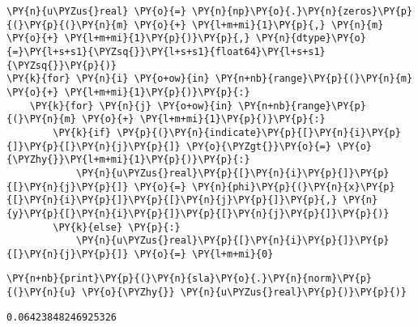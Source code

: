     \begin{tcolorbox}[breakable, size=fbox, boxrule=1pt, pad at break*=1mm,colback=cellbackground, colframe=cellborder]
\begin{Verbatim}[commandchars=\\\{\}]
\PY{n}{u\PYZus{}real} \PY{o}{=} \PY{n}{np}\PY{o}{.}\PY{n}{zeros}\PY{p}{(}\PY{p}{(}\PY{n}{m} \PY{o}{+} \PY{l+m+mi}{1}\PY{p}{,} \PY{n}{m} \PY{o}{+} \PY{l+m+mi}{1}\PY{p}{)}\PY{p}{,} \PY{n}{dtype}\PY{o}{=}\PY{l+s+s1}{\PYZsq{}}\PY{l+s+s1}{float64}\PY{l+s+s1}{\PYZsq{}}\PY{p}{)}
\PY{k}{for} \PY{n}{i} \PY{o+ow}{in} \PY{n+nb}{range}\PY{p}{(}\PY{n}{m} \PY{o}{+} \PY{l+m+mi}{1}\PY{p}{)}\PY{p}{:}
    \PY{k}{for} \PY{n}{j} \PY{o+ow}{in} \PY{n+nb}{range}\PY{p}{(}\PY{n}{m} \PY{o}{+} \PY{l+m+mi}{1}\PY{p}{)}\PY{p}{:}
        \PY{k}{if} \PY{p}{(}\PY{n}{indicate}\PY{p}{[}\PY{n}{i}\PY{p}{]}\PY{p}{[}\PY{n}{j}\PY{p}{]} \PY{o}{\PYZgt{}}\PY{o}{=} \PY{o}{\PYZhy{}}\PY{l+m+mi}{1}\PY{p}{)}\PY{p}{:}
            \PY{n}{u\PYZus{}real}\PY{p}{[}\PY{n}{i}\PY{p}{]}\PY{p}{[}\PY{n}{j}\PY{p}{]} \PY{o}{=} \PY{n}{phi}\PY{p}{(}\PY{n}{x}\PY{p}{[}\PY{n}{i}\PY{p}{]}\PY{p}{[}\PY{n}{j}\PY{p}{]}\PY{p}{,} \PY{n}{y}\PY{p}{[}\PY{n}{i}\PY{p}{]}\PY{p}{[}\PY{n}{j}\PY{p}{]}\PY{p}{)}
        \PY{k}{else} \PY{p}{:}
            \PY{n}{u\PYZus{}real}\PY{p}{[}\PY{n}{i}\PY{p}{]}\PY{p}{[}\PY{n}{j}\PY{p}{]} \PY{o}{=} \PY{l+m+mi}{0}
\end{Verbatim}
\end{tcolorbox}

    \begin{tcolorbox}[breakable, size=fbox, boxrule=1pt, pad at break*=1mm,colback=cellbackground, colframe=cellborder]
\begin{Verbatim}[commandchars=\\\{\}]
\PY{n+nb}{print}\PY{p}{(}\PY{n}{sla}\PY{o}{.}\PY{n}{norm}\PY{p}{(}\PY{n}{u} \PY{o}{\PYZhy{}} \PY{n}{u\PYZus{}real}\PY{p}{)}\PY{p}{)}
\end{Verbatim}
\end{tcolorbox}

    \begin{Verbatim}[commandchars=\\\{\}]
0.06423848246925326
    \end{Verbatim}

